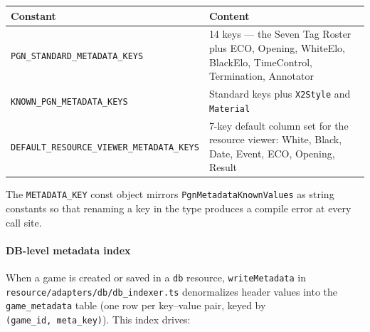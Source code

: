 \documentclass[]{article}
\let\oldparagraph\paragraph
\renewcommand{\paragraph}[1]{\oldparagraph{#1}\mbox{}}
\begin{document}
\begin{longtable}[]{@{}ll@{}}
\toprule
\begin{minipage}[b]{0.05\columnwidth}\raggedright\strut
Constant\strut
\end{minipage} & \begin{minipage}[b]{0.05\columnwidth}\raggedright\strut
Content\strut
\end{minipage}\tabularnewline
\midrule
\endhead
\begin{minipage}[t]{0.05\columnwidth}\raggedright\strut
\texttt{PGN\_STANDARD\_METADATA\_KEYS}\strut
\end{minipage} & \begin{minipage}[t]{0.05\columnwidth}\raggedright\strut
14 keys --- the Seven Tag Roster plus ECO, Opening, WhiteElo, BlackElo,
TimeControl, Termination, Annotator\strut
\end{minipage}\tabularnewline
\begin{minipage}[t]{0.05\columnwidth}\raggedright\strut
\texttt{KNOWN\_PGN\_METADATA\_KEYS}\strut
\end{minipage} & \begin{minipage}[t]{0.05\columnwidth}\raggedright\strut
Standard keys plus \texttt{X2Style} and \texttt{Material}\strut
\end{minipage}\tabularnewline
\begin{minipage}[t]{0.05\columnwidth}\raggedright\strut
\texttt{DEFAULT\_RESOURCE\_VIEWER\_METADATA\_KEYS}\strut
\end{minipage} & \begin{minipage}[t]{0.05\columnwidth}\raggedright\strut
7-key default column set for the resource viewer: White, Black, Date,
Event, ECO, Opening, Result\strut
\end{minipage}\tabularnewline
\bottomrule
\end{longtable}

The \texttt{METADATA\_KEY} const object mirrors
\texttt{PgnMetadataKnownValues} as string constants so that renaming a
key in the type produces a compile error at every call site.

\paragraph{DB-level metadata index}\label{db-level-metadata-index}

When a game is created or saved in a \texttt{db} resource,
\texttt{writeMetadata} in \texttt{resource/adapters/db/db\_indexer.ts}
denormalizes header values into the \texttt{game\_metadata} table (one
row per key--value pair, keyed by \texttt{(game\_id,\ meta\_key)}). This
index drives:
\end{document}
